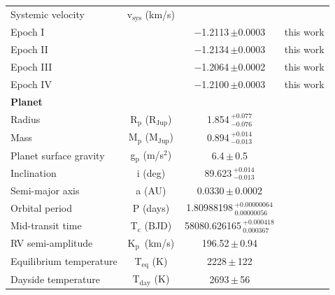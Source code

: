 \documentclass{aa}
\newcommand{\kp}{K$_\mathrm{p}$}
\begin{document}
\begin{table}[h]
\begin{tabular}{lccc}
        Systemic velocity       & v$_\mathrm{sys}$ (km/s)           &  &  \\
        \hspace{1cm} Epoch I    &  & $-$1.2113\,$\pm$0.0003              & this work \\
        \hspace{1cm} Epoch II   &  & $-$1.2134\,$\pm$0.0003              & this work \\
        \hspace{1cm} Epoch III  &  & $-$1.2064\,$\pm$0.0002              & this work \\
        \hspace{1cm} Epoch IV   &  & $-$1.2100\,$\pm$0.0003              & this work \\
        \hline
        \noalign{\smallskip}
        \textbf{Planet} &&& \\
        \noalign{\smallskip}
        Radius                  & R$_\mathrm{p}$ (R$_\mathrm{Jup}$) & 1.854\,$^{+0.077}_{-0.076}$   & \citet{ehrenreich2020} \\ 
        Mass                    & M$_\mathrm{p}$ (M$_\mathrm{Jup}$) & 0.894\,$^{+0.014}_{-0.013}$   & \citet{ehrenreich2020} \\
        Planet surface gravity  & g$_\mathrm{p}$ (m/s$^2$)                   & 6.4\,$\pm$\,0.5               & \citet{ehrenreich2020} \\
        Inclination             & i (deg)                         & 89.623\,$^{+0.014}_{-0.013}$  & \citet{ehrenreich2020} \\
        Semi-major axis         & a (AU)                          & 0.0330\,$\pm$\,0.0002         & \citet{ehrenreich2020} \\
        Orbital period          & P (days)                        & 1.80988198\,$^{+0.00000064}_{0.00000056}$ & \citet{ehrenreich2020} \\
        Mid-transit time        & T$_\mathrm{c}$ (BJD)              & 58080.626165\,$^{+0.000418}_{0.000367}$    & \citet{ehrenreich2020} \\
        RV semi-amplitude       & \kp\ (km/s)             & 196.52\,$\pm$\,0.94           & \citet{ehrenreich2020} \\
        Equilibrium temperature & T$_\mathrm{eq}$ (K)               & 2228\,$\pm$\,122              & \citet{ehrenreich2020} \\
        Dayside temperature     & T$_\mathrm{day}$ (K)              & 2693\,$\pm$\,56               & \citet{garhart2020} \\
         \hline
    \end{tabular}
    \label{tab:properties}
\end{table}
\end{document}
